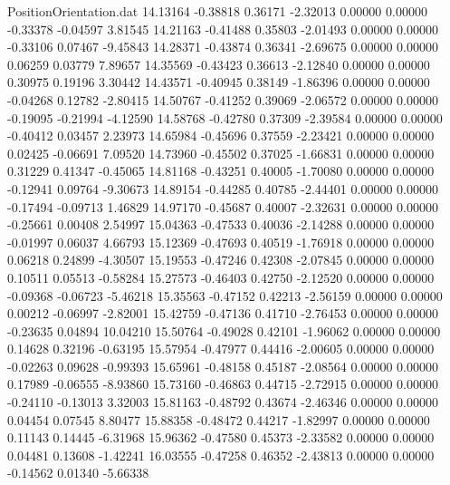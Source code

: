\begin{filecontents}{PositionOrientation.dat}
  14.13164   -0.38818    0.36171    -2.32013    0.00000    0.00000   -0.33378   -0.04597    3.81545
  14.21163   -0.41488    0.35803    -2.01493    0.00000    0.00000   -0.33106    0.07467   -9.45843
  14.28371   -0.43874    0.36341    -2.69675    0.00000    0.00000    0.06259    0.03779    7.89657
  14.35569   -0.43423    0.36613    -2.12840    0.00000    0.00000    0.30975    0.19196    3.30442
  14.43571   -0.40945    0.38149    -1.86396    0.00000    0.00000   -0.04268    0.12782   -2.80415
  14.50767   -0.41252    0.39069    -2.06572    0.00000    0.00000   -0.19095   -0.21994   -4.12590
  14.58768   -0.42780    0.37309    -2.39584    0.00000    0.00000   -0.40412    0.03457    2.23973
  14.65984   -0.45696    0.37559    -2.23421    0.00000    0.00000    0.02425   -0.06691    7.09520
  14.73960   -0.45502    0.37025    -1.66831    0.00000    0.00000    0.31229    0.41347   -0.45065
  14.81168   -0.43251    0.40005    -1.70080    0.00000    0.00000   -0.12941    0.09764   -9.30673
  14.89154   -0.44285    0.40785    -2.44401    0.00000    0.00000   -0.17494   -0.09713    1.46829
  14.97170   -0.45687    0.40007    -2.32631    0.00000    0.00000   -0.25661    0.00408    2.54997
  15.04363   -0.47533    0.40036    -2.14288    0.00000    0.00000   -0.01997    0.06037    4.66793
  15.12369   -0.47693    0.40519    -1.76918    0.00000    0.00000    0.06218    0.24899   -4.30507
  15.19553   -0.47246    0.42308    -2.07845    0.00000    0.00000    0.10511    0.05513   -0.58284
  15.27573   -0.46403    0.42750    -2.12520    0.00000    0.00000   -0.09368   -0.06723   -5.46218
  15.35563   -0.47152    0.42213    -2.56159    0.00000    0.00000    0.00212   -0.06997   -2.82001
  15.42759   -0.47136    0.41710    -2.76453    0.00000    0.00000   -0.23635    0.04894   10.04210
  15.50764   -0.49028    0.42101    -1.96062    0.00000    0.00000    0.14628    0.32196   -0.63195
  15.57954   -0.47977    0.44416    -2.00605    0.00000    0.00000   -0.02263    0.09628   -0.99393
  15.65961   -0.48158    0.45187    -2.08564    0.00000    0.00000    0.17989   -0.06555   -8.93860
  15.73160   -0.46863    0.44715    -2.72915    0.00000    0.00000   -0.24110   -0.13013    3.32003
  15.81163   -0.48792    0.43674    -2.46346    0.00000    0.00000    0.04454    0.07545    8.80477
  15.88358   -0.48472    0.44217    -1.82997    0.00000    0.00000    0.11143    0.14445   -6.31968
  15.96362   -0.47580    0.45373    -2.33582    0.00000    0.00000    0.04481    0.13608   -1.42241
  16.03555   -0.47258    0.46352    -2.43813    0.00000    0.00000   -0.14562    0.01340   -5.66338

\end{filecontents}
